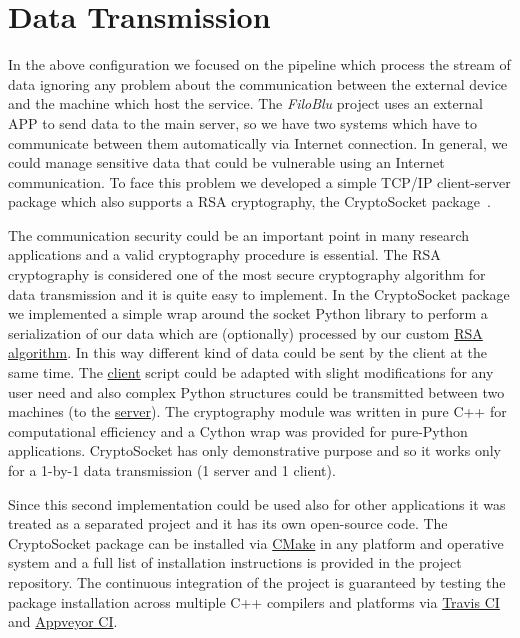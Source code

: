 \documentclass{standalone}
\begin{document}
\section*{Data Transmission}

In the above configuration we focused on the pipeline which process the stream of data ignoring any problem about the communication between the external device and the machine which host the service.
The \emph{FiloBlu} project uses an external APP to send data to the main server, so we have two systems which have to communicate between them automatically via Internet connection.
In general, we could manage sensitive data that could be vulnerable using an Internet communication.
To face this problem we developed a simple TCP/IP client-server package which also supports a RSA cryptography, the \textsf{CryptoSocket} package~\cite{CryptoSocket}.

The communication security could be an important point in many research applications and a valid cryptography procedure is essential.
The RSA cryptography is considered one of the most secure cryptography algorithm for data transmission and it is quite easy to implement.
In the \textsf{CryptoSocket} package we implemented a simple wrap around the \textsf{socket} \textsf{Python} library to perform a serialization of our data which are (optionally) processed by our custom \href{https://en.wikipedia.org/wiki/RSA_(cryptosystem)}{RSA algorithm}.
In this way different kind of data could be sent by the client at the same time.
The \href{https://github.com/Nico-Curti/CryptoSocket/blob/master/CryptoSocket/examples/client.py}{client} script could be adapted with slight modifications for any user need and also complex \textsf{Python} structures could be transmitted between two machines (to the \href{https://github.com/Nico-Curti/CryptoSocket/blob/master/CryptoSocket/examples/server.py}{server}).
The cryptography module was written in pure \textsf{C++} for computational efficiency and a \textsf{Cython} wrap was provided for pure-\textsf{Python} applications.
\textsf{CryptoSocket} has only demonstrative purpose and so it works only for a 1-by-1 data transmission (1 server and 1 client).

Since this second implementation could be used also for other applications it was treated as a separated project and it has its own open-source code.
The \textsf{CryptoSocket} package can be installed via \href{https://github.com/Nico-Curti/CryptoSocket/blob/master/CMakeLists.txt}{\textsf{CMake}} in any platform and operative system and a full list of installation instructions is provided in the project repository.
The continuous integration of the project is guaranteed by testing the package installation across multiple \textsf{C++} compilers and platforms via \href{https://github.com/Nico-Curti/CryptoSocket/blob/master/.travis.yml}{Travis CI} and \href{https://github.com/Nico-Curti/CryptoSocket/blob/master/appveyor.yml}{Appveyor CI}.
\end{document}
